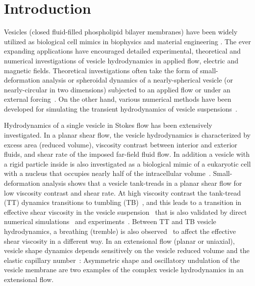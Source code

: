 \documentclass[prf,superscriptaddress,showpacs]{revtex4-1}
\begin{document}
\section{Introduction}
Vesicles (closed fluid-filled phospholipid bilayer membranes) have been
widely utilized as biological cell mimics in biophysics and material
engineering \cite{}.  The ever expanding applications have encouraged
detailed experimental, theoretical and numerical investigations of
vesicle hydrodynamics in applied flow, electric and magnetic fields.
Theoretical investigations often take the form of small-deformation
analysis or spheroidal dynamics of a nearly-spherical vesicle (or
nearly-circular in two dimensions) subjected to an applied flow or under
an external forcing~\cite{Barthes-BieselRallison1981_JFM,
Misbah2006_PRL, Vlahovska2007_PRE, Finken2008_EPL,
ZhangZahnTanLin2013_PoF, Nganguia2013_PRE}.  On the other hand, various
numerical methods have been developed for simulating the transient
hydrodynamics of vesicle suspensions~\cite{BagchiJohoson2005_JBE,
Biben2005_EJP, Veerapaneni2009_JCP, SeolHuKimLai2016_JCP}.  

Hydrodynamics of a single vesicle in Stokes flow has been extensively
investigated. In a planar shear flow, the vesicle hydrodynamics is
characterized by excess area (reduced volume), viscosity contrast
between interior and exterior fluids, and shear rate of the imposed
far-field fluid flow. In addition a vesicle with a rigid particle inside
is also investigated as a biological mimic of a eukaryotic cell with a
nucleus that occupies nearly half of the intracellular
volume~\cite{Veerapaneni2011_PRL}. Small-deformation analysis shows that
a vesicle tank-treads in a planar shear flow for low viscosity contrast
and shear rate. At high viscosity contrast the tank-tread (TT) dynamics
transitions to tumbling (TB)~\cite{Misbah2006_PRL, Vlahovska2007_PRE},
and this leads to a transition in effective shear viscosity in the
vesicle suspension~\cite{Misbah2006_PRL,Vitkova2008_BJ} that is also
validated by direct numerical
simulations~\cite{GhigliottiBibenMisbah2010_JFM} and
experiments~\cite{KantslerSegreSteinberg2008_EPL,
ZabuskySegreDeschamps2011_PoF}.  Between TT and TB vesicle
hydrodynamics, a breathing (tremble) is also
observed~\cite{Misbah2006_PRL,KantslerSegreSteinberg2008_PRL,
ZhaoShaqfeh2011_JFM, SpannZhaoShaqfeh2014_PoF} to affect the effective
shear viscosity in a different way.  In an extensional flow (planar or
uniaxial), vesicle shape dynamics depends sensitively on the vesicle
reduced volume  and the elastic capillary
number~\cite{KantslerSegreSteinberg2008_PRL, ZhaoShaqfeh2013_JFM,
Narsimhan2014_JFM, DahlNarsimhanGouveia2016_SoftMatt}: Asymmetric shape
and oscillatory undulation of the vesicle membrane are two examples of
the complex vesicle hydrodynamics in an extensional flow.
\end{document}
